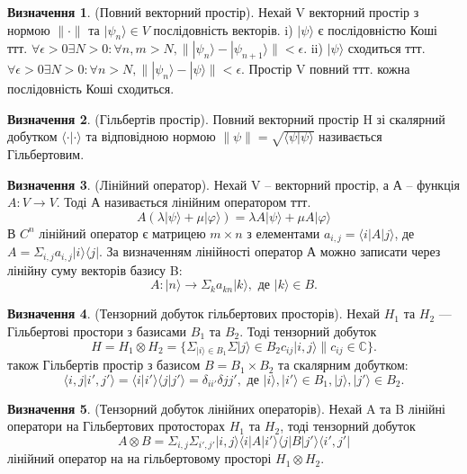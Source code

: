 \documentclass{article}
\theoremstyle{definition}
\newtheorem{definition}{Визначення}
\begin{document}
\begin{definition} (Повний векторний простір).
Нехай V векторний простір з нормою $\parallel\cdot\parallel$ та $|\psi_n\rangle \in V$
послідовність векторів.
i) $|\psi\rangle$ є послідовністю Коші ттт. $\forall\epsilon>0\exists N>0 : \forall n,m> N, \parallel |\psi_n\rangle - |\psi_{n+1}\rangle\parallel < \epsilon$.
ii) $|\psi\rangle$ сходиться ттт. $\forall\epsilon>0\exists N>0 : \forall n> N, \parallel |\psi_n\rangle - |\psi\rangle\parallel < \epsilon$.
Простір V повний ттт. кожна послідовність Коші сходиться.
\end{definition}

\begin{definition} (Гільбертів простір).
Повний векторний простір H зі скалярний добутком $\langle\cdot|\cdot\rangle$ та
відповідною нормою $\parallel\psi\parallel=\sqrt{\langle\psi|\psi\rangle}$ називається Гільбертовим.
\end{definition}

\begin{definition} (Лінійний оператор).
Нехай V -- векторний простір, а А -- функція $A : V \rightarrow V$. Тоді А
називається лінійним оператором ттт.
$$
A(\lambda|\psi\rangle + \mu|\varphi\rangle) = \lambda A |\psi\rangle + \mu A |\varphi\rangle
$$
В $C^n$ лінійний оператор є матрицею $m \times n$
з елементами $a_{i,j} = \langle i | A | j \rangle$, де $A = \Sigma_{i,j} a_{i,j} | i\rangle\langle j|$.
За визначенням лінійності оператор А можно записати через лінійну суму векторів базису B:
$$
A : |n\rangle \rightarrow \Sigma_k a_{kn}|k\rangle, \text{\ де\ } |k\rangle \in B.
$$
\end{definition}

\begin{definition} (Тензорний добуток гільбертових просторів).
Нехай $H_1$ та $H_2$ --- Гільбертові простори з базисами $B_1$ та $B_2$.
Тоді тензорний добуток
$$
H = H_1 \otimes H_2 = \{ \Sigma_{|i\rangle \in B_1} \Sigma{|j\rangle \in B_2} c_{ij}|i,j\rangle \| c_{ij} \in \mathbb{C} \}.
$$
також Гільбертів простір з базисом $B = B_1 \times B_2$ та скалярним добутком:
$$
\langle i,j | i',j' \rangle = \langle i | i' \rangle \langle j | j' \rangle  = \delta_{ii'}\delta{jj'}, \text{\ де\ } |i\rangle,|i'\rangle \in B_1, |j\rangle,|j'\rangle \in B_2.
$$
\end{definition}

\begin{definition} (Тензорний добуток лінійних операторів).
Нехай A та B лінійні оператори на Гільбертових протосторах $H_1$ та $H_2$, тоді
тензорний добуток
$$
A \otimes B = \Sigma_{i,j}\Sigma_{i',j'}|i,j\rangle\langle i|A|i'\rangle\langle j|B|j'\rangle\langle i',j'|
$$
лінійний оператор на на гільбертовому просторі $H_1\otimes H_2$.
\end{definition}
\end{document}
